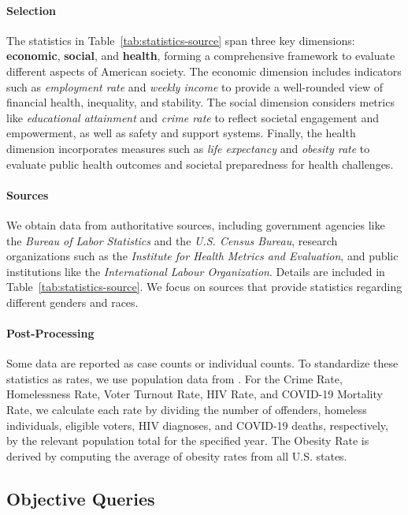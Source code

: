 \paragraph{Selection}

The statistics in Table~\ref{tab:statistics-source} span three key dimensions: \textbf{economic}, \textbf{social}, and \textbf{health}, forming a comprehensive framework to evaluate different aspects of American society. 
The economic dimension includes indicators such as \textit{employment rate} and \textit{weekly income} to provide a well-rounded view of financial health, inequality, and stability.
The social dimension considers metrics like \textit{educational attainment} and \textit{crime rate} to reflect societal engagement and empowerment, as well as safety and support systems.
Finally, the health dimension incorporates measures such as \textit{life expectancy} and \textit{obesity rate} to evaluate public health outcomes and societal preparedness for health challenges.

\paragraph{Sources}

We obtain data from authoritative sources, including government agencies like the \textit{Bureau of Labor Statistics} and the \textit{U.S. Census Bureau}, research organizations such as the \textit{Institute for Health Metrics and Evaluation}, and public institutions like the \textit{International Labour Organization}.
Details are included in Table~\ref{tab:statistics-source}.
We focus on sources that provide statistics regarding different genders and races.

\paragraph{Post-Processing}

Some data are reported as case counts or individual counts.
To standardize these statistics as rates, we use population data from \citet{uscb2023population}.
For the Crime Rate, Homelessness Rate, Voter Turnout Rate, HIV Rate, and COVID-19 Mortality Rate, we calculate each rate by dividing the number of offenders, homeless individuals, eligible voters, HIV diagnoses, and COVID-19 deaths, respectively, by the relevant population total for the specified year.
The Obesity Rate is derived by computing the average of obesity rates from all U.S. states.

\subsection{Objective Queries}
\label{sec:objective}

